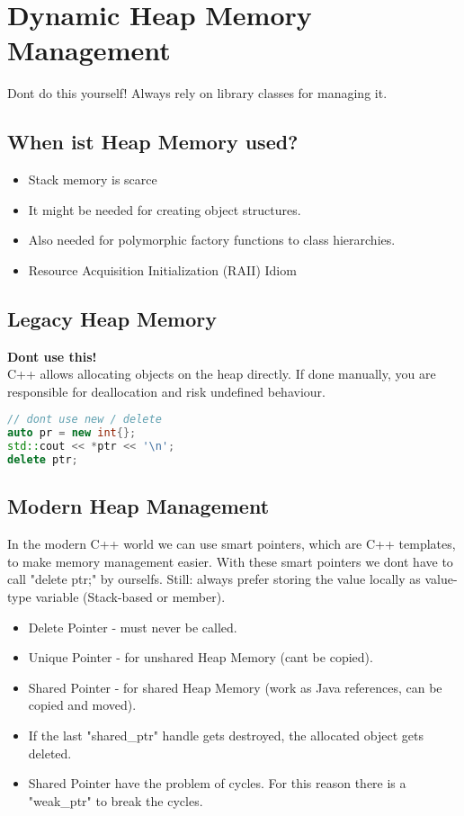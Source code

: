 \section{Dynamic Heap Memory Management}
Dont do this yourself! Always rely on library classes for managing it.

\subsection{When ist Heap Memory used?}
\begin{itemize}
  \itemsep -0.5em 
  \item Stack memory is scarce
  \item It might be needed for creating object structures.
  \item Also needed for polymorphic factory functions to class hierarchies.
  \item Resource Acquisition Initialization (RAII) Idiom
\end{itemize}

\subsection{Legacy Heap Memory}
\textbf{Dont use this!}\\
C++ allows allocating objects on the heap directly. If done manually, you are responsible for deallocation and risk undefined behaviour.
\begin{lstlisting}[language=C++]
// dont use new / delete
auto pr = new int{};
std::cout << *ptr << '\n';
delete ptr;
\end{lstlisting}

\subsection{Modern Heap Management}
In the modern C++ world we can use smart pointers, which are C++ templates, to make memory management easier. With these smart pointers we dont have to call "delete ptr;" by ourselfs. Still: always prefer storing the value locally as value-type variable (Stack-based or member).
\begin{itemize}
  \itemsep -0.5em 
  \item Delete Pointer - must never be called.
  \item Unique Pointer - for unshared Heap Memory (cant be copied).
  \item Shared Pointer - for shared Heap Memory (work as Java references, can be copied and moved).
  \item If the last "shared\_ptr" handle gets destroyed, the allocated object gets deleted.
  \item Shared Pointer have the problem of cycles. For this reason there is a "weak\_ptr" to break the cycles.
\end{itemize}


